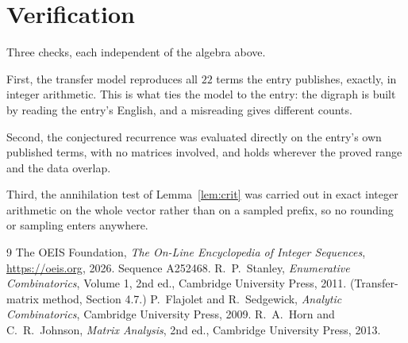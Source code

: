 \documentclass[11pt,a4paper]{article}
\theoremstyle{plain}
\theoremstyle{definition}
\begin{document}
\section{Verification}

Three checks, each independent of the algebra above.

First, the transfer model reproduces all $22$ terms the entry publishes, exactly, in
integer arithmetic. This is what ties the model to the entry: the digraph is built by reading
the entry's English, and a misreading gives different counts.

Second, the conjectured recurrence was evaluated directly on the entry's own published terms,
with no matrices involved, and holds wherever the proved range and the data overlap.

Third, the annihilation test of Lemma~\ref{lem:crit} was carried out in exact integer
arithmetic on the whole vector rather than on a sampled prefix, so no rounding or sampling
enters anywhere.

\begin{thebibliography}{9}
 The OEIS Foundation, \emph{The On-Line Encyclopedia of Integer
Sequences}, \url{https://oeis.org}, 2026. Sequence A252468.
 R.~P.~Stanley, \emph{Enumerative Combinatorics}, Volume 1, 2nd ed.,
Cambridge University Press, 2011. (Transfer-matrix method, Section 4.7.)
 P.~Flajolet and R.~Sedgewick, \emph{Analytic Combinatorics}, Cambridge
University Press, 2009.
 R.~A.~Horn and C.~R.~Johnson, \emph{Matrix Analysis}, 2nd ed., Cambridge
University Press, 2013.
\end{thebibliography}
\end{document}
